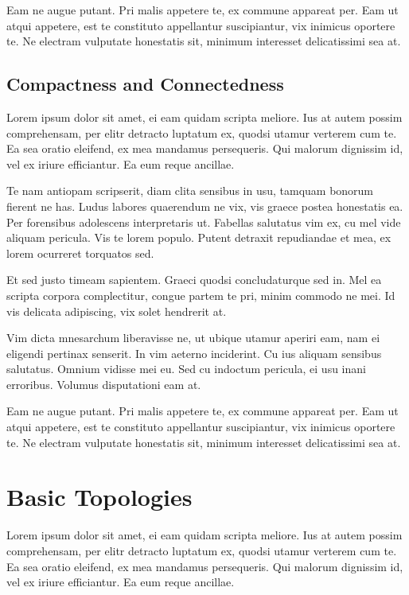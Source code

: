 \documentclass[12pt, a4paper]{article}
\theoremstyle{definition}
\theoremstyle{remark}
\numberwithin{equation}{section}
\numberwithin{figure}{section}
\numberwithin{table}{section}
\begin{document}
            Eam ne augue putant. Pri malis appetere te, ex commune appareat per. Eam ut atqui appetere, est te constituto appellantur suscipiantur, vix inimicus oportere te. Ne electram vulputate honestatis sit, minimum interesset delicatissimi sea at.        
        \subsection{Compactness and Connectedness}
            Lorem ipsum dolor sit amet, ei eam quidam scripta meliore. Ius at autem possim comprehensam, per elitr detracto luptatum ex, quodsi utamur verterem cum te. Ea sea oratio eleifend, ex mea mandamus persequeris. Qui malorum dignissim id, vel ex iriure efficiantur. Ea eum reque ancillae.

            Te nam antiopam scripserit, diam clita sensibus in usu, tamquam bonorum fierent ne has. Ludus labores quaerendum ne vix, vis graece postea honestatis ea. Per forensibus adolescens interpretaris ut. Fabellas salutatus vim ex, cu mel vide aliquam pericula. Vis te lorem populo. Putent detraxit repudiandae et mea, ex lorem ocurreret torquatos sed.

            Et sed justo timeam sapientem. Graeci quodsi concludaturque sed in. Mel ea scripta corpora complectitur, congue partem te pri, minim commodo ne mei. Id vis delicata adipiscing, vix solet hendrerit at.

            Vim dicta mnesarchum liberavisse ne, ut ubique utamur aperiri eam, nam ei eligendi pertinax senserit. In vim aeterno inciderint. Cu ius aliquam sensibus salutatus. Omnium vidisse mei eu. Sed cu indoctum pericula, ei usu inani erroribus. Volumus disputationi eam at.

            Eam ne augue putant. Pri malis appetere te, ex commune appareat per. Eam ut atqui appetere, est te constituto appellantur suscipiantur, vix inimicus oportere te. Ne electram vulputate honestatis sit, minimum interesset delicatissimi sea at.
    
    \newpage
    \section{Basic Topologies}
        Lorem ipsum dolor sit amet, ei eam quidam scripta meliore. Ius at autem possim comprehensam, per elitr detracto luptatum ex, quodsi utamur verterem cum te. Ea sea oratio eleifend, ex mea mandamus persequeris. Qui malorum dignissim id, vel ex iriure efficiantur. Ea eum reque ancillae.
\end{document}
